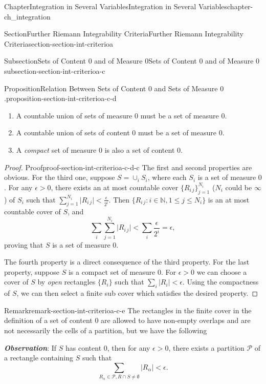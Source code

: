 \documentclass[oneside,10pt,]{book}
\newcommand{\alert}[1]{\textbf{\textit{#1}}}
\numberwithin{equation}{section}
\newcommand{\bbN}{\mathbb{N}}
\newcommand{\cP}{\mathcal{P}}
\newcommand{\lt}{<}
\begin{document}
\begin{chapterptx}{Chapter}{Integration in Several Variables}{}{Integration in Several Variables}{}{}{chapter-ch_integration}
\begin{sectionptx}{Section}{Further Riemann Integrability Criteria}{}{Further Riemann Integrability Criteria}{}{}{section-section-int-criterioa}
\begin{subsectionptx}{Subsection}{Sets of Content \(0\) and of Measure \(0\)}{}{Sets of Content \(0\) and of Measure \(0\)}{}{}{subsection-section-int-criterioa-c}
\begin{proposition}{Proposition}{Relation Between Sets of Content \(0\) and Sets of Measure \(0\).}{}{proposition-section-int-criterioa-c-d}
\begin{enumerate}
\item{}A countable union of sets of measure \(0\) must be a set of measure \(0\).%
\item{}A countable union of sets of content \(0\) must be a set of measure \(0\).%
\item{}A \emph{compact} set of measure \(0\) is also a set of content \(0\).%
\end{enumerate}
\end{proposition}
\begin{proof}{Proof}{}{proof-section-int-criterioa-c-d-c}
The first and second properties are obvious. For the third one, suppose \(S=\cup_{i}S_{i}\), where each \(S_{i}\) is a set of measure \(0\). For any \(\epsilon>0\), there exists an at most countable  cover \(\{R_{i\,j}\}_{j=1}^{N_{i}}\) (\(N_{i}\) could be \(\infty\)) of \(S_{i}\) such that \(\sum_{j=1}^{N_{i}}\vert R_{i\,j}\vert < \frac{\epsilon}{2^{i}}\). Then \(\{R_{i\,j}: i\in \bbN, 1\le j \le N_{i}\}\) is an at most countable cover of \(S\), and%
\begin{equation*}
\sum_{i}\sum_{j=1}^{N_{i}}\vert R_{i\,j}\vert < \sum_{i} \frac{\epsilon}{2^{i}}=\epsilon,
\end{equation*}
proving that \(S\) is a set of measure \(0\).%
\par
The fourth property is a direct consequence of the third property. For the last property, suppose \(S\) is a compact set of measure \(0\). For \(\epsilon>0\) we can choose a cover of \(S\) by  \emph{open} rectangles \(\{R_{i}\} \) such that \(\sum_{i}\vert R_{i}\vert < \epsilon\). Using the compactness of \(S\), we can then select a finite sub cover which satisfies the desired property.%
\end{proof}
\begin{remark}{Remark}{}{remark-section-int-criterioa-c-e}%
The rectangles in the finite cover in the definition of a set of content \(0\) are allowed to have non-empty overlaps and are not necessarily the cells of a partition,  but we have the following%
\par
\alert{Observation}: If \(S\) has content \(0\), then for any \(\epsilon >0\), there exists a partition \(\cP\) of a rectangle containing \(S\) such that%
\begin{equation}
\sum_{R_{\alpha}\in \cP, R\cap S \ne \emptyset} |R_{\alpha}| \lt \epsilon.\label{men-content0cover}
\end{equation}
%
\par

\end{remark}
\end{subsectionptx}
\end{sectionptx}
\end{chapterptx}
\end{document}
